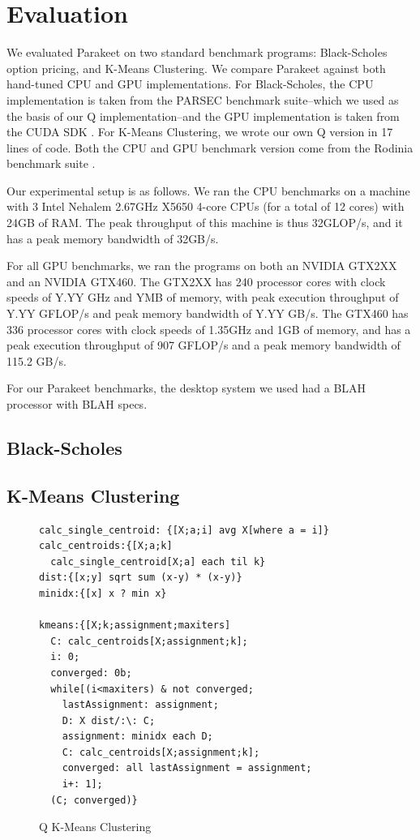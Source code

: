 \documentclass[preprint]{sigplanconf}
\begin{document}
\section{Evaluation}
\label{Evaluation}

We evaluated Parakeet on two standard benchmark programs: Black-Scholes option
pricing, and K-Means Clustering.  We compare Parakeet against both hand-tuned
CPU and GPU implementations.  For Black-Scholes, the CPU implementation is
taken from the PARSEC \cite{Bien08} benchmark suite--which we used as the basis
of our Q implementation--and the GPU implementation is taken from the CUDA SDK
\cite{NvidSD}.  For K-Means Clustering, we wrote our own Q version in 17 lines
of code.  Both the CPU and GPU benchmark version come from the Rodinia
benchmark suite \cite{Che09}.

Our experimental setup is as follows.  We ran the CPU benchmarks on a machine
with 3 Intel Nehalem 2.67GHz X5650 4-core CPUs (for a total of 12 cores) with
24GB of RAM.  The peak throughput of this machine is thus 32GLOP/s, and it has
a peak memory bandwidth of 32GB/s.

For all GPU benchmarks, we ran the programs on both an NVIDIA GTX2XX and an
NVIDIA GTX460.  The GTX2XX has 240 processor cores with clock speeds of
Y.YY GHz and YMB of memory, with peak execution throughput of Y.YY GFLOP/s and
peak memory bandwidth of Y.YY GB/s.  The GTX460 has 336 processor cores with
clock speeds of 1.35GHz and 1GB of memory, and has a peak execution throughput
of 907 GFLOP/s and a peak memory bandwidth of 115.2 GB/s.

For our Parakeet benchmarks, the desktop system we used had a BLAH processor
with BLAH specs.

\subsection{Black-Scholes}


\subsection{K-Means Clustering}

\begin{figure}
\begin{verbatim}
calc_single_centroid: {[X;a;i] avg X[where a = i]}
calc_centroids:{[X;a;k]
  calc_single_centroid[X;a] each til k}
dist:{[x;y] sqrt sum (x-y) * (x-y)}
minidx:{[x] x ? min x}

kmeans:{[X;k;assignment;maxiters]
  C: calc_centroids[X;assignment;k];
  i: 0;
  converged: 0b;
  while[(i<maxiters) & not converged;
    lastAssignment: assignment;
    D: X dist/:\: C;
    assignment: minidx each D;
    C: calc_centroids[X;assignment;k];
    converged: all lastAssignment = assignment;
    i+: 1];
  (C; converged)}
\end{verbatim}
\caption{Q K-Means Clustering}
\label{QKMeans}
\end{figure}
\end{document}
